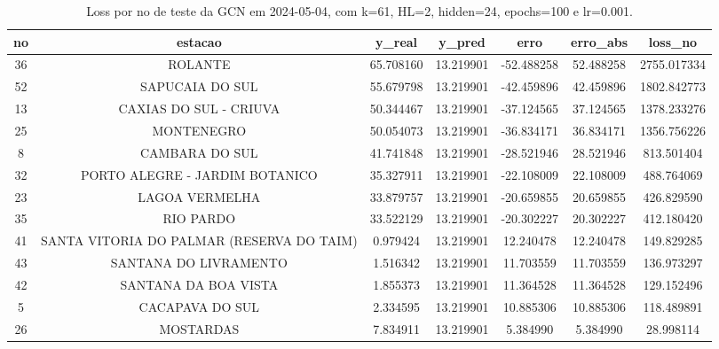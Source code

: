 \begin{table}[h]
\centering
\caption{Loss por no de teste da GCN em 2024-05-04, com k=61, HL=2, hidden=24, epochs=100 e lr=0.001.}
\label{tab:gcn_loss_k61_hl2_h24_e100_d20240504}
\begin{tabular}{ccccccc}
\toprule
no & estacao & y\_real & y\_pred & erro & erro\_abs & loss\_no \\
\midrule
36 & ROLANTE & 65.708160 & 13.219901 & -52.488258 & 52.488258 & 2755.017334 \\
52 & SAPUCAIA DO SUL & 55.679798 & 13.219901 & -42.459896 & 42.459896 & 1802.842773 \\
13 & CAXIAS DO SUL - CRIUVA & 50.344467 & 13.219901 & -37.124565 & 37.124565 & 1378.233276 \\
25 & MONTENEGRO & 50.054073 & 13.219901 & -36.834171 & 36.834171 & 1356.756226 \\
8 & CAMBARA DO SUL & 41.741848 & 13.219901 & -28.521946 & 28.521946 & 813.501404 \\
32 & PORTO ALEGRE - JARDIM BOTANICO & 35.327911 & 13.219901 & -22.108009 & 22.108009 & 488.764069 \\
23 & LAGOA VERMELHA & 33.879757 & 13.219901 & -20.659855 & 20.659855 & 426.829590 \\
35 & RIO PARDO & 33.522129 & 13.219901 & -20.302227 & 20.302227 & 412.180420 \\
41 & SANTA VITORIA DO PALMAR (RESERVA DO TAIM) & 0.979424 & 13.219901 & 12.240478 & 12.240478 & 149.829285 \\
43 & SANTANA DO LIVRAMENTO & 1.516342 & 13.219901 & 11.703559 & 11.703559 & 136.973297 \\
42 & SANTANA DA BOA VISTA & 1.855373 & 13.219901 & 11.364528 & 11.364528 & 129.152496 \\
5 & CACAPAVA DO SUL & 2.334595 & 13.219901 & 10.885306 & 10.885306 & 118.489891 \\
26 & MOSTARDAS & 7.834911 & 13.219901 & 5.384990 & 5.384990 & 28.998114 \\
\bottomrule
\end{tabular}
\end{table}

